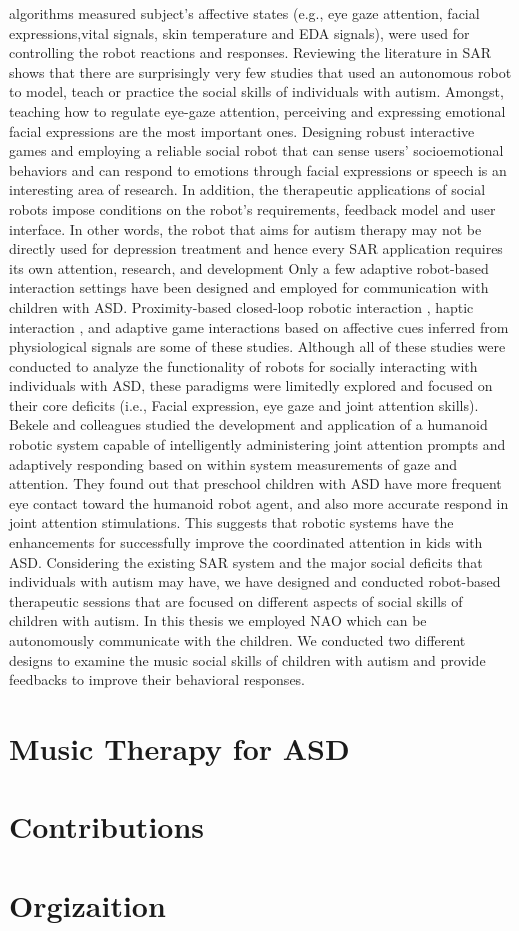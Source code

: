 algorithms measured subject’s affective states (e.g., eye gaze attention, facial expressions,vital signals, 
skin temperature and EDA signals), were used for controlling the robot
reactions and responses.
Reviewing the literature in SAR \cite{DefineSocial2005, SocialInteract2003} shows that there are surprisingly very few
studies that used an autonomous robot to model, teach or practice the social skills of
individuals with autism. Amongst, teaching how to regulate eye-gaze attention, perceiving
and expressing emotional facial expressions are the most important ones. Designing robust
interactive games and employing a reliable social robot that can sense users’ socioemotional
behaviors and can respond to emotions through facial expressions or speech is
an interesting area of research. In addition, the therapeutic applications of social robots
impose conditions on the robot’s requirements, feedback model and user interface. In other
words, the robot that aims for autism therapy may not be directly used for depression
treatment and hence every SAR application requires its own attention, research, and
development
Only a few adaptive robot-based interaction settings have been designed and
employed for communication with children with ASD. Proximity-based closed-loop
robotic interaction \cite{LookApproach1972}, haptic interaction \cite{DiffEffect1966}, and adaptive game interactions based on
affective cues inferred from physiological signals \cite{SysObserv1968} are some of these studies. Although
all of these studies were conducted to analyze the functionality of robots for socially interacting with individuals 
with ASD, these paradigms were limitedly explored and
focused on their core deficits (i.e., Facial expression, eye gaze and joint attention skills).
Bekele and colleagues \cite{AutisticDist1943} studied the development and application of a humanoid
robotic system capable of intelligently administering joint attention prompts and adaptively
responding based on within system measurements of gaze and attention. They found out
that preschool children with ASD have more frequent eye contact toward the humanoid
robot agent, and also more accurate respond in joint attention stimulations. This suggests
that robotic systems have the enhancements for successfully improve the coordinated
attention in kids with ASD.
Considering the existing SAR system and the major social deficits that individuals
with autism may have, we have designed and conducted robot-based therapeutic sessions
that are focused on different aspects of social skills of children with autism. In this thesis
we employed NAO which can be autonomously communicate with the children.
We conducted two different designs to examine the music social skills of children with autism
and provide feedbacks to improve their behavioral responses. 

\section{Music Therapy for ASD}

\section{Contributions}


\section{Orgizaition}

